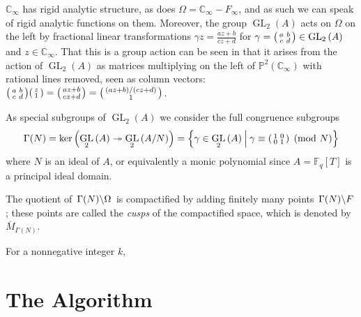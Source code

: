 \documentclass[11pt]{article}
\newcommand*{\CCi}{\mathbb{C}_\infty}
\newcommand*{\FF}{\mathbb{F}}
\newcommand*{\PP}{\mathbb{P}}
\newcommand*{\onto}{\twoheadrightarrow}
\DeclareMathOperator{\GLL}{GL}
\newcommand*{\GL}[2][]{\GLL_{#1}\parens{#2}}
\newcommand*{\setst}[2]{\left\{#1\:\middle|\:#2\right\}}
\newcommand*{\parens}[1]{\left(#1\right)}
\newcommand*{\lquotient}[2]{\left. #1 \middle\backslash #2 \right.}
\begin{document}
$\CCi$ has rigid analytic structure, as does $\Omega = \CCi - F_\infty$, and as such we can speak of rigid analytic functions on them.
Moreover, the group $\GL[2]{A}$ acts on $\Omega$ on the left by fractional linear transformations $\gamma z = \frac{az+b}{cz+d}$ for $\gamma = \begin{psmallmatrix} a & b \\ c & d \end{psmallmatrix} \in \GL[2]{A}$ and $z \in \CCi$.
That this is a group action can be seen in that it arises from the action of $\GL[2]{A}$ as matrices multiplying on the left of $\PP^2(\CCi)$ with rational lines removed, seen as column vectors: $\begin{psmallmatrix} a & b \\ c & d \end{psmallmatrix} \begin{psmallmatrix} z \\ 1 \end{psmallmatrix} = \begin{psmallmatrix} a z + b \\ c z + d \end{psmallmatrix} = \begin{psmallmatrix} \parens{a z + b}/\parens{c z + d} \\ 1 \end{psmallmatrix}$.

As special subgroups of $\GL[2]{A}$ we consider the full congruence subgroups
\[ \Gamma(N) = \ker\parens{\GL[2]{A} \onto \GL[2]{A/N}} = \setst{\gamma \in \GL[2]{A}}{\gamma \equiv \begin{psmallmatrix} 1 & 0 \\ 0 & 1 \end{psmallmatrix} \pmod{N}} \]
where $N$ is an ideal of $A$, or equivalently a monic polynomial since $A = \FF_q[T]$ is a principal ideal domain.

The quotient of $\lquotient{\Gamma(N)}{\Omega}$ is compactified by adding finitely many points $\lquotient{\Gamma(N)}{F}$; these points are called the \emph{cusps} of the compactified space, which is denoted by $\overline{M}_{\Gamma(N)}$.


For a nonnegative integer $k$, %


\section{The Algorithm} \label{sec:algorithm}
\end{document}
